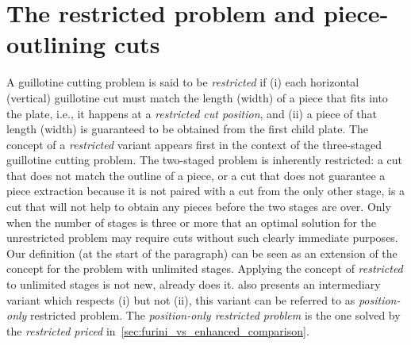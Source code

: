 \documentclass[ppgc,tese,english,formais,babel]{iiufrgs}
\begin{document}
\section{The restricted problem and piece-outlining cuts}

A guillotine cutting problem is said to be \emph{restricted} if (i) each horizontal (vertical) guillotine cut must match the length (width) of a piece that fits into the plate, i.e., it happens at a \emph{restricted cut position}, and (ii) a piece of that length (width) is guaranteed to be obtained from the first child plate.
The concept of a \emph{restricted} variant appears first in the context of the three-staged guillotine cutting problem.
The two-staged problem is inherently restricted: a cut that does not match the outline of a piece, or a cut that does not guarantee a piece extraction because it is not paired with a cut from the only other stage, is a cut that will not help to obtain any pieces before the two stages are over.
Only when the number of stages is three or more that an optimal solution for the unrestricted problem may require cuts without such clearly immediate purposes.
Our definition (at the start of the paragraph) can be seen as an extension of the concept for the problem with unlimited stages.
Applying the concept of \emph{restricted} to unlimited stages is not new, \citet{furini:2016} already does it. \citet{furini:2016} also presents an intermediary variant which respects (i) but not (ii), this variant can be referred to as \emph{position-only} restricted problem.
The \emph{position-only restricted problem} is the one solved by the \emph{restricted priced} in~\cref{sec:furini_vs_enhanced_comparison}.
\end{document}
